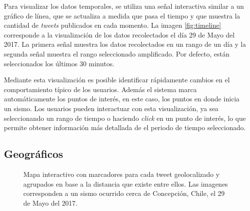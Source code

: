 	
	Para visualizar los datos temporales, se utiliza una señal interactiva similar a un gráfico de línea, que se actualiza a medida que pasa el tiempo y que muestra la cantidad de \textit{tweets} publicados en cada momento.
	La imagen \ref{fig:timeline} corresponde a la visualización de los datos recolectados el día 29 de Mayo del 2017.
	La primera señal muestra los datos recolectados en un rango de un día y la segunda señal muestra el rango seleccionado amplificado. Por defecto, están seleccionados los últimos 30 minutos.
		
	Mediante esta visualización es posible identificar rápidamente cambios en el comportamiento típico de los usuarios.
	Además el sistema marca automáticamente los puntos de interés, en este caso, los puntos en donde inicia un sismo. 
	Los usuarios pueden interactuar con esta visualización, ya sea seleccionando un rango de tiempo o haciendo \textit{click} en un punto de interés, lo que permite obtener información más detallada de el periodo de tiempo seleccionado. 
	
	
	\subsection{Geográficos}
	
	\begin{figure}[ht]
	\centering
	\hfill
  	\caption{Mapa interactivo con marcadores para cada tweet geolocalizado y agrupados en base a la distancia que existe entre ellos. Las imagenes corresponden a un sismo ocurrido cerca de  Concepción, Chile, el 29 de Mayo del 2017.}
  	\label{fig:worldmap}
  	\end{figure}
	 	
